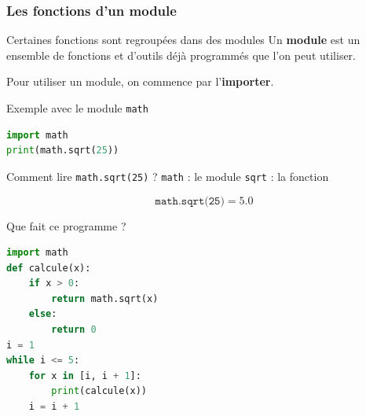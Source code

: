 \documentclass[10pt]{beamer}
\begin{document}
\begin{frame}[containsverbatim]
	\frametitle{Les fonctions d'un module}
	\begin{block}{Certaines fonctions sont regroupées dans des modules}
		Un \textbf{module} est un ensemble de fonctions et d'outils
		déjà programmés que l'on peut utiliser.
		
		\vspace{0.05cm}
		
		Pour utiliser un module, on commence par l'\textbf{importer}.
	\end{block}
	
	\vspace{0.15cm}
	
	\begin{exampleblock}{Exemple avec le module \texttt{math}}
		\begin{lstlisting}[language=Python]	
import math
print(math.sqrt(25))
		\end{lstlisting}
	\end{exampleblock}
	

	\vspace{0.1cm}
	
	\begin{alertblock}{Comment lire \texttt{math.sqrt(25)} ?}
		\texttt{math} : le module \qquad
		\texttt{sqrt} : la fonction
		
		\[
		\texttt{math.sqrt(25)} = 5.0
		\]
	\end{alertblock}

	
\end{frame}
\begin{frame}[containsverbatim]
	
	
	\begin{exampleblock}{Que fait ce programme ?}
		\begin{lstlisting}[language=Python]
import math
def calcule(x):
	if x > 0:
		return math.sqrt(x)
	else:
		return 0
i = 1
while i <= 5:
	for x in [i, i + 1]:
		print(calcule(x))
	i = i + 1
		\end{lstlisting}
	\end{exampleblock}
\end{frame}
\end{document}
